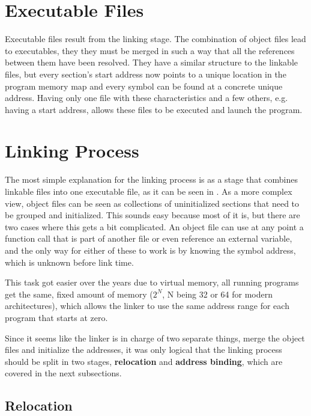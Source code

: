 \section{Executable Files}
\label{sec:e-files}

Executable files result from the linking stage. The combination of object files lead to executables, they they must be merged in such a way that all the references between them have been resolved. They have a similar structure to the linkable files, but every section's start address now points to a unique location in the program memory map and every symbol can be found at a concrete unique address. Having only one file with these characteristics and a few others, e.g. having a start address, allows these files to be executed and launch the program.

\section{Linking Process}
\label{sec:link-proc}

The most simple explanation for the linking process is as a stage that combines linkable files into one executable file, as it can be seen in . As a more complex view, object files can be seen as collections of uninitialized sections that need to be grouped and initialized. This sounds easy because most of it is, but there are two cases where this gets a bit complicated. An object file can use at any point a function call that is part of another file or even reference an external variable, and the only way for either of these to work is by knowing the symbol address, which is unknown before link time.

This task got easier over the years due to virtual memory, all running programs get the same, fixed amount of memory ($2^{N}$, N being 32 or 64 for modern architectures), which allows the linker to use the same address range for each program that starts at zero.

Since it seems like the linker is in charge of two separate things, merge the object files and initialize the addresses, it was only logical that the linking process should be split in two stages, \textbf{relocation} and \textbf{address binding}, which are covered in the next subsections.


\subsection{Relocation}
\label{sub-sec:reloc}

